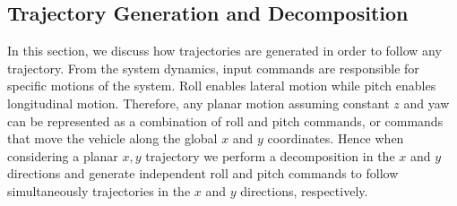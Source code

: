 \documentclass[letterpaper, 10 pt, conference]{ieeeconf}  %
\newcommand\NB[1]{$\spadesuit$\footnote{NB: #1}}
\begin{document}
\subsection{Trajectory Generation and Decomposition} \label{sec:traj}

In this section, we discuss how trajectories are generated in order to follow any trajectory.
From the system dynamics, input commands are responsible for specific motions of the system. Roll enables lateral motion while pitch enables longitudinal motion. Therefore, any planar motion assuming constant $z$ and yaw can be represented as a combination of roll and pitch commands, or commands that move the vehicle along the global $x$ and $y$ coordinates. Hence when considering a planar $x,y$ trajectory we perform a decomposition in the $x$ and $y$ directions and generate independent roll and pitch commands to follow simultaneously trajectories in the $x$ and $y$ directions, respectively. 

\end{document}
